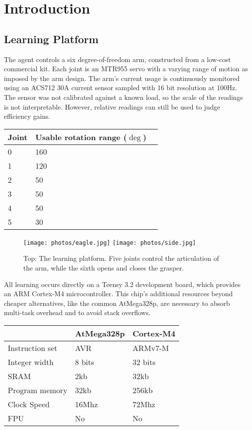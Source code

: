 \documentclass{article}
\begin{document}
\section{Introduction}

\subsection{Learning Platform}

The agent controls a six degree-of-freedom arm, constructed from a low-cost commercial kit. Each joint is an MTR955 servo with a varying range of motion as imposed by the arm design. The arm's current usage is continuously monitored using an ACS712 30A current sensor sampled with 16 bit resolution at 100Hz. The sensor was not calibrated against a known load, so the scale of the readings is not interpretable. However, relative readings can still be used to judge efficiency gains.

\begin{center}
	\begin{tabular}{ l l l}
		Joint & Usable rotation range ($\deg$)  \\ \midrule
		0 & 160 \\
		1 & 120 \\
		2 & 50 \\
		3 & 50 \\
		4 & 50\\ 
		5 & 30
	\end{tabular}
\end{center}

\begin{figure}
	\centering
	\texttt{[image: photos/eagle.jpg]}
	\texttt{[image: photos/side.jpg]}
	\caption{Top: The learning platform. Five joints control the articulation of the arm, while the sixth opens and closes the grasper.}
	\label{fig:platform}
\end{figure}

All learning occurs directly on a Teensy 3.2 development board, which provides an ARM Cortex-M4 microcontroller. This chip's additional resources beyond cheaper alternatives, like the common AtMega328p, are necessary to absorb multi-task overhead and to avoid stack overflows.

\begin{center}
	\begin{tabular}{ l l l}
		& AtMega328p & Cortex-M4  \\ \midrule
		Instruction set & AVR & ARMv7-M\\
		Integer width & 8 bits & 32 bits\\
		SRAM & 2kb & 32kb\\
		Program memory & 32kb & 256kb\\
		Clock Speed & 16Mhz & 72Mhz\\ 
		FPU & No & No
		
	\end{tabular}
\end{center}
\end{document}
